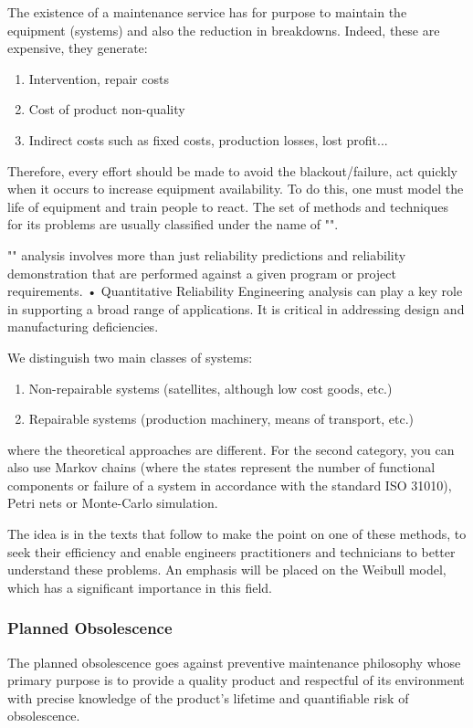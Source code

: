 	The existence of a maintenance service has for purpose to maintain the equipment (systems) and also the reduction in breakdowns. Indeed, these are expensive, they generate:
	
	\begin{enumerate}
		\item Intervention, repair costs		
		\item Cost of product non-quality		
		\item Indirect costs such as fixed costs, production losses, lost profit...
	\end{enumerate}
	Therefore, every effort should be made to avoid the blackout/failure, act quickly when it occurs to increase equipment availability. To do this, one must model the life of equipment and train people to react. The set of methods and techniques for its problems are usually classified under the name of "".
	
	"" analysis involves more than just reliability predictions and reliability demonstration that are performed against a given program or project requirements. • Quantitative Reliability Engineering analysis can play a key role in supporting a broad range of applications. It is critical
in addressing design and manufacturing deficiencies.
	
	We distinguish two main classes of systems:
	\begin{enumerate}		
		\item Non-repairable systems (satellites, although low cost goods, etc.)
		\item Repairable systems (production machinery, means of transport, etc.)
	\end{enumerate}
	where the theoretical approaches are different. For the second category, you can also use Markov chains (where the states represent the number of functional components or failure of a system in accordance with the standard ISO 31010), Petri nets or Monte-Carlo simulation.
		
	The idea is in the texts that follow to make the point on one of these methods, to seek their efficiency and enable engineers practitioners and technicians to better understand these problems. An emphasis will be placed on the Weibull model, which has a significant importance in this field.
		
	\pagebreak
	\subsubsection{Planned Obsolescence}
	The planned obsolescence goes against preventive maintenance philosophy whose primary purpose is to provide a quality product and respectful of its environment with precise knowledge of the product's lifetime and quantifiable risk of obsolescence.
		
